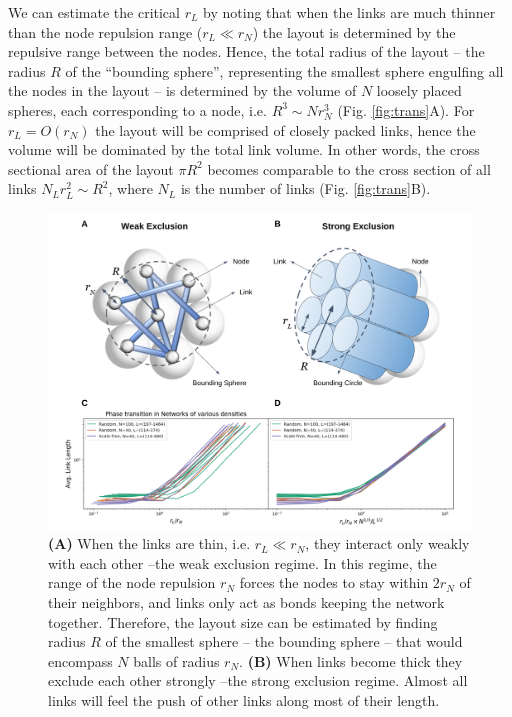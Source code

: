 \documentclass[nofootinbib,preprint,floatfix,titlepage,endfloats]{revtex4} %
\begin{document}
We can estimate the critical $r_L$ by noting that when the links are much thinner than the node repulsion range ($r_L\ll r_N$) the layout is determined by the repulsive range between the nodes. Hence, the total radius of the layout  -- the radius $R$ of the ``bounding sphere'', representing the smallest sphere engulfing all the nodes in the layout -- is determined by the volume of $N$ loosely placed spheres, each corresponding to a node, i.e. $ R^3 \sim Nr_N^3 $ (Fig. \ref{fig:trans}A). 
For $r_L = O(r_N)$ the layout will be comprised of closely packed links, hence the volume will be dominated by the total link volume. In other words, the cross sectional area of the layout $\pi R^2$ becomes comparable to the cross section of all links $ N_L r_L^2 \sim R^2$, where $N_L$ is the number of links (Fig. \ref{fig:trans}B). 
\begin{figure}
    \centering
    \includegraphics[width=\columnwidth]{fig-09-19/transition-2.png}
    \caption{\scriptsize {\bf (A)} When the links are thin, i.e. $r_L\ll r_N$, they interact only weakly with each other --the weak exclusion regime. 
    In this regime, the range of the node repulsion $r_N$ forces the nodes to stay within $2r_N$ of their neighbors, and links only act as bonds keeping the network together.
    Therefore, the layout size can be estimated by finding radius $R$ of the smallest sphere -- the bounding sphere -- that would encompass $N$ balls of radius $r_N$. 
    {\bf (B)} When links become thick they exclude each other strongly --the strong exclusion regime. 
    Almost all links will feel the push of other links along most of their length. 
}
\end{figure}
\end{document}
